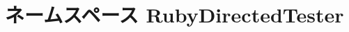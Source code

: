 \hypertarget{namespaceRubyDirectedTester}{
\section{ネームスペース RubyDirectedTester}
\label{namespaceRubyDirectedTester}
}
